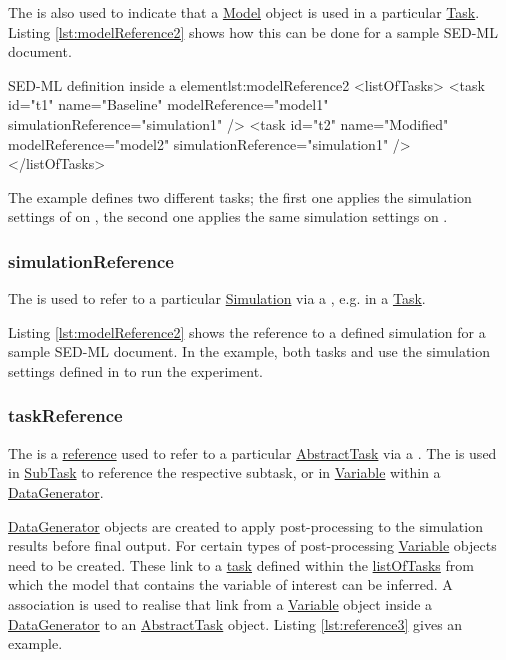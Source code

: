 The  is also used to indicate that a \hyperref[class:model]{Model} object is used in a particular  \hyperref[class:task]{Task}. Listing \ref{lst:modelReference2} shows how this can be done for a sample SED-ML document.

\begin{myXmlLst}{SED-ML  definition inside a  element}{lst:modelReference2}
<listOfTasks>
	<task id="t1" name="Baseline" modelReference="model1" simulationReference="simulation1" />
	<task id="t2" name="Modified" modelReference="model2" simulationReference="simulation1" />
</listOfTasks>
\end{myXmlLst}

The example defines two different tasks; the first one applies the simulation settings of  on , the second one applies the same simulation settings on .


\subsubsection{simulationReference}
\label{sec:simulationReference}
The  is used to refer to a particular \hyperref[class:simulation]{Simulation}  via a \hyperref[type:sidref]{}, e.g. in a \hyperref[class:task]{Task}. 

Listing \ref{lst:modelReference2} shows the reference to a defined simulation for a sample SED-ML document. In the example, both tasks  and  use the simulation settings defined in  to run the experiment.


\subsubsection{taskReference}
\label{sec:taskReference}
The  is a \hyperref[sec:reference]{reference} used to refer to a particular \hyperref[class:abstractTask]{AbstractTask} via a \hyperref[type:sidref]{}. The  is used in \hyperref[class:subTask]{SubTask} to reference the respective subtask, or in \hyperref[class:variable]{Variable} within a \hyperref[class:dataGenerator]{DataGenerator}.

\hyperref[class:dataGenerator]{DataGenerator} objects are created to apply post-processing to the simulation results before final output. 
For certain types of post-processing \hyperref[class:variable]{Variable} objects need to be created.
These link to a \hyperref[class:abstractTask]{task} defined within the \hyperref[sec:listOfTasks]{listOfTasks} from which the model that contains the variable of interest can be inferred. A  association is used to realise that link from a \hyperref[class:variable]{Variable} object inside a \hyperref[class:dataGenerator]{DataGenerator} to an \hyperref[class:abstractTask]{AbstractTask} object. Listing \ref{lst:reference3} gives an example.

